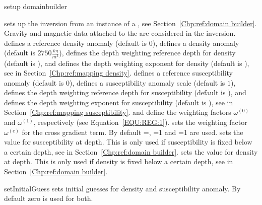 \begin{methoddesc}[JointGravityMagneticInversion]{setup}{
domainbuilder
}

sets up the inversion from an instance  of a , see Section~\ref{Chp:ref:domain builder}.
Gravity and magnetic data attached to the  are considered in the inversion.
 defines a reference density anomaly (default is $0$),
 defines a density anomaly (default is $2750 \frac{kg}{m^3}$),
 defines the depth weighting reference depth for density (default is \None), and
 defines the depth weighting exponent for density (default is \None),
see  in Section~\ref{Chp:ref:mapping density}.
 defines a reference susceptibility anomaly (default is $0$),
 defines a susceptibility anomaly scale (default is $1$),
 defines the depth weighting reference depth for susceptibility (default is \None), and
 defines the depth weighting exponent for susceptibility (default is \None),
see  in Section~\ref{Chp:ref:mapping susceptibility}.
 and  define the weighting factors
$\omega^{(0)}$ and
$\omega^{(1)}$, respectively (see Equation~\ref{EQU:REG:1}). 
 sets the weighting factor $\omega^{(c)}$ for the cross gradient term. 
By default =\None, =1 and =1 are used.
 sets the value for susceptibility at depth. This is only used if susceptibility is fixed below a certain depth,
see  in Section~\ref{Chp:ref:domain builder}.
 sets the value for density at depth. This is only used if density is fixed below a certain depth,
see  in Section~\ref{Chp:ref:domain builder}.
\end{methoddesc}

\begin{methoddesc}[JointGravityMagneticInversion]{setInitialGuess}{ }
sets initial guesses for density and susceptibility anomaly.
By default zero is used for both.
\end{methoddesc}

